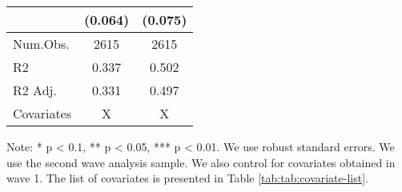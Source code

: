 \begin{table}
\begin{threeparttable}
\begin{tabular}[t]{lcc}
 & (\num{0.064}) & (\num{0.075})\\
\midrule
Num.Obs. & \num{2615} & \num{2615}\\
R2 & \num{0.337} & \num{0.502}\\
R2 Adj. & \num{0.331} & \num{0.497}\\
Covariates & X & X\\
\bottomrule
\end{tabular}
\begin{tablenotes}
\item Note: * p < 0.1, ** p < 0.05, *** p < 0.01. We use robust standard errors. We use the second wave analysis sample. We also control for covariates obtained in wave 1. The list of covariates is presented in Table \ref{tab:tab:covariate-list}.
\end{tablenotes}
\end{threeparttable}
\end{table}
